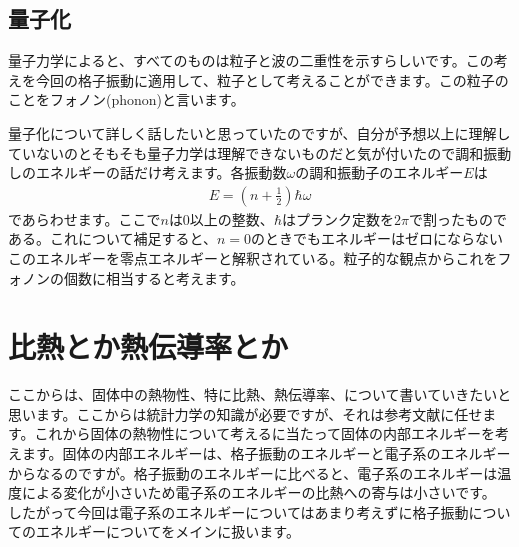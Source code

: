 \documentclass[10pt,b5paper,papersize,dvipdfmx]{jsbook}
\begin{document}
\subsection{量子化}
量子力学によると、すべてのものは粒子と波の二重性を示すらしいです。この考えを今回の格子振動に適用して、粒子として考えることができます。この粒子のことをフォノン(phonon)と言います。\par
量子化について詳しく話したいと思っていたのですが、自分が予想以上に理解していないのとそもそも量子力学は理解できないものだと気が付いたので調和振動しのエネルギーの話だけ考えます。各振動数$\omega$の調和振動子のエネルギー$E$は
\begin{align}
  E = \left(n + \frac{1}{2}\right)\hbar \omega
\end{align}
であらわせます。ここで$n$は0以上の整数、$\hbar$はプランク定数を$2\pi$で割ったものである。これについて補足すると、$n = 0$のときでもエネルギーはゼロにならないこのエネルギーを零点エネルギーと解釈されている。粒子的な観点からこれをフォノンの個数に相当すると考えます。

\section{比熱とか熱伝導率とか}
ここからは、固体中の熱物性、特に比熱、熱伝導率、について書いていきたいと思います。ここからは統計力学の知識が必要ですが、それは参考文献に任せます。これから固体の熱物性について考えるに当たって固体の内部エネルギーを考えます。固体の内部エネルギーは、格子振動のエネルギーと電子系のエネルギーからなるのですが。格子振動のエネルギーに比べると、電子系のエネルギーは温度による変化が小さいため電子系のエネルギーの比熱への寄与は小さいです。
したがって今回は電子系のエネルギーについてはあまり考えずに格子振動についてのエネルギーについてをメインに扱います。
\end{document}
